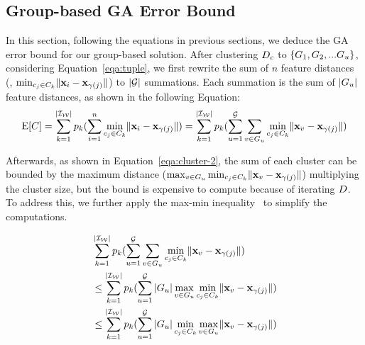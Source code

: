 




\subsection{Group-based GA Error Bound}

In this section, following the equations in previous sections, we deduce the GA error bound for our group-based solution. 
%
After clustering $D_c$ to $\{ G_1 , G_2, ...G_u\}$, considering Equation~\ref{eqa:tuple}, we  first rewrite the sum of $n$ feature distances (\ie, $\min_{c_j\in C_k}\lVert\mathbf{x}_i - \mathbf{x}_{\gamma(j)}\rVert$) to   $|\mathcal{G}|$ summations. Each summation is the sum of $|G_u|$ feature distances, as shown in the following Equation:
\vspace{-0.5em}
\begin{equation}\label{eqa:cluster-1}
 \mathrm{E}[C] = \sum_{k= 1}^{|\mathcal{I_W}|} p_k (\sum_{i=1}^n \min_{c_j\in C_k}\lVert\mathbf{x}_i - \mathbf{x}_{\gamma(j)}\rVert) =  \sum_{k= 1}^{|\mathcal{I_W}|} p_k (\sum_{u=1}^{\mathcal{G}}\sum_{v \in G_u} \min_{c_j\in C_k}\lVert\mathbf{x}_v - \mathbf{x}_{\gamma(j)}\rVert)
\end{equation}

Afterwards, as shown in Equation~\ref{eqa:cluster-2},  the sum of each cluster can be bounded by  the maximum distance ($\max_{v \in G_u} \min_{c_j\in C_k}\lVert\mathbf{x}_v - \mathbf{x}_{\gamma(j)}\rVert$)  multiplying the  cluster size, but the bound is expensive to compute because of iterating $D$. To address this, we further apply the max-min inequality~\cite{} to simplify the computations. 


\begin{equation}\label{eqa:cluster-2}
\begin{aligned}
&  \sum_{k= 1}^{|\mathcal{I_W}|} p_k (\sum_{u=1}^{\mathcal{G}}\sum_{v \in G_u} \min_{c_j\in C_k}\lVert\mathbf{x}_v - \mathbf{x}_{\gamma(j)}\rVert) \\
& \leq \sum_{k= 1}^{|\mathcal{I_W}|} p_k (\sum_{u=1}^{\mathcal{G}} |G_u| \max_{v \in G_u} \min_{c_j\in C_k}\lVert\mathbf{x}_v - \mathbf{x}_{\gamma(j)}\rVert) \\
&  \leq \sum_{k= 1}^{|\mathcal{I_W}|} p_k (\sum_{u=1}^{\mathcal{G}} |G_u| \min_{c_j\in C_k} \max_{v \in G_u} \lVert\mathbf{x}_v - \mathbf{x}_{\gamma(j)}\rVert)
\end{aligned}
\end{equation}



